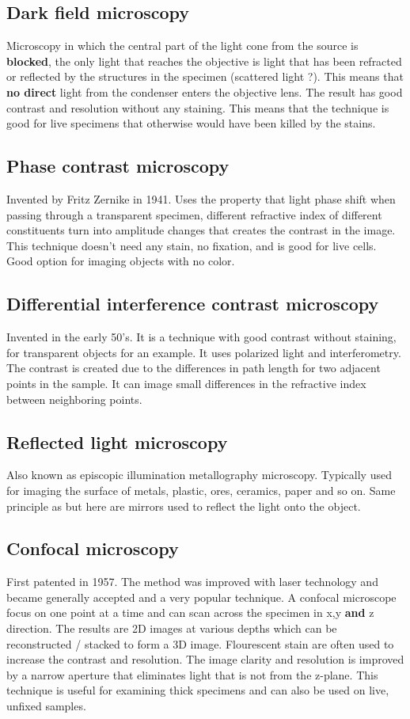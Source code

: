 	\subsection*{Dark field microscopy}
	 Microscopy in which the central part of the light cone from the source is \textbf{blocked}, the only light that reaches the objective is light that has been refracted or reflected by the structures in the specimen (scattered light ?). This means that \textbf{no direct} light from the condenser enters the objective lens. The result has good contrast and resolution without any staining. This means that the technique is good for live specimens that otherwise would have been killed by the stains.  

	 \subsection*{Phase contrast microscopy}
	 Invented by Fritz Zernike in 1941. Uses the property that light phase shift when passing through a transparent specimen, different refractive index of different constituents turn into amplitude changes that creates the contrast in the image. This technique doesn't need any stain, no fixation, and is good for live cells. Good option for imaging objects with no color. 

	 \subsection*{Differential interference contrast microscopy}
	 Invented in the early 50's. It is a technique with good contrast without staining, for transparent objects for an example. It uses polarized light and interferometry. The contrast is created due to the differences in path length for two adjacent points in the sample. It can image small differences in the refractive index between neighboring points.

	 \subsection*{Reflected light microscopy}
	 Also known as episcopic illumination metallography microscopy. Typically used for imaging the surface of metals, plastic, ores, ceramics, paper and so on. Same principle as but here are mirrors used to reflect the light onto the object. 

	 \subsection*{Confocal microscopy}
	 First patented in 1957. The method was improved with laser technology and became generally accepted and a very popular technique. A confocal microscope focus on one point at a time and can scan across the specimen in x,y \textbf{and} z direction. The results are 2D images at various depths which can be reconstructed / stacked to form a 3D image. Flourescent stain are often used to increase the contrast and resolution. The image clarity and resolution is improved by a narrow aperture that eliminates light that is not from the z-plane. This technique is useful for examining thick specimens and can also be used on live, unfixed samples. 

